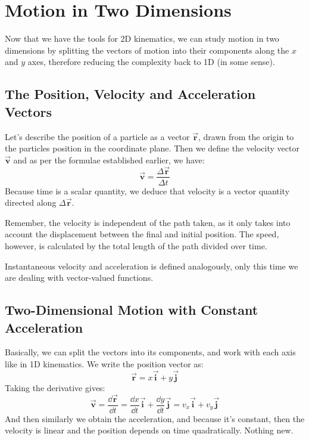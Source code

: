 \documentclass[12pt]{article}
\begin{document}
\section{Motion in Two Dimensions}
\par Now that we have the tools for 2D kinematics, we can study motion in two dimensions by splitting the vectors of motion into their components along the $x$ and $y$ axes, therefore reducing the complexity back to 1D (in some sense).
\subsection*{The Position, Velocity and Acceleration Vectors}
\par Let's describe the position of a particle as a vector $\mathbf{\vec{r}}$, drawn from the origin to the particles position in the coordinate plane. Then we define the velocity vector $\mathbf{\vec{v}}$ and as per the formulae established earlier, we have:
\begin{equation}
    \vec{\mathbf{v}} = \dfrac{\Delta\vec{\mathbf{r}}}{\Delta t}
\end{equation}
Because time is a scalar quantity, we deduce that velocity is a vector quantity directed along $\Delta \mathbf{\vec{r}}$. 
\begin{confusion}
    Remember, the velocity is independent of the path taken, as it only takes into account the displacement between the final and initial position. The speed, however, is calculated by the total length of the path divided over time.
\end{confusion}
    Instantaneous velocity and acceleration is defined analogously, only this time we are dealing with vector-valued functions. 
    \subsection*{Two-Dimensional Motion with Constant Acceleration}
    Basically, we can split the vectors into its components, and work with each axis like in 1D kinematics. We write the position vector as:
    \begin{equation}
        \vec{\mathbf{r}} = x \vec{\mathbf{i}} + y \vec{\mathbf{j}}
    \end{equation}
    Taking the derivative gives:
    \begin{equation}
        \vec{\mathbf{v}} = \dfrac{\dd \vec{\mathbf{r}}}{\dd t} = \dfrac{\dd x}{\dd t} \vec{\mathbf{i}} + \dfrac{\dd y}{\dd t} \vec{\mathbf{j}} = v_x \vec{\mathbf{i}} + v_y \vec{\mathbf{j}}
    \end{equation}
    And then similarly we obtain the acceleration, and because it's constant, then the velocity is linear and the position depends on time quadratically. Nothing new.
\end{document}
